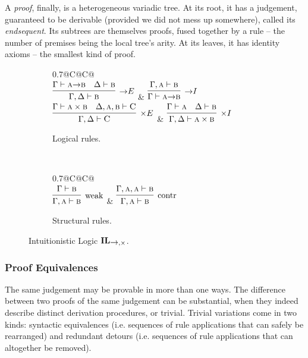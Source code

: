 A \textit{proof}, finally, is a heterogeneous variadic tree.
At its root, it has a judgement, guaranteed to be derivable (provided we did not mess up somewhere), called its \textit{endsequent}.
Its subtrees are themselves proofs, fused together by a rule -- the number of premises being the local tree's arity.
At its leaves, it has identity axioms -- the smallest kind of proof.

\begin{figure}
	\centering
	\begin{subfigure}{1\textwidth}
		\centering
		\begin{tabularx}{0.7\textwidth}{@{}C@{\qquad}C@{}}
		\\[\smallsep]
		$\infer[\ii E]{\Gamma, \Delta \vdash \prop{b}}{\Gamma \vdash \prop{a} \ii \prop{b} & \Delta \vdash \prop{b}}$ 
		& 
		$\infer[\ii I]{\Gamma \vdash \prop{a} \ii \prop{b}}{\Gamma, \prop{a} \vdash \prop{b}}$\\[\smallsep]
		$\infer[\times E]{\Gamma,\Delta \vdash \prop C}{\Gamma \vdash \prop{a} \times \prop{b} & \Delta, \prop{a} , \prop{b} \vdash \prop C}$ 
		&
		$\infer[\times I]{\Gamma, \Delta \vdash \prop{a} \times \prop{b}}{\Gamma \vdash \prop{a} & \Delta \vdash \prop{b}}$
		\end{tabularx}
		\caption{Logical rules.}
		\label{subfigure:intuitionistic_logic_rules:logical}
	\end{subfigure}\\[\midsep]
	\begin{subfigure}{1\textwidth}
		\centering
		\begin{tabularx}{0.7\textwidth}{@{}C@{\qquad}C@{}}
		\\[\smallsep]
		$\infer[\Weakening{}]{\Gamma, \prop{a} \vdash \prop{b}}{\Gamma \vdash \prop{b}} $ 
		&
		$\infer[\Contraction{}]{\Gamma, \prop{a} \vdash \prop{b}}{\Gamma, \prop{a}, \prop{a} \vdash \prop{b}}$
		\end{tabularx}
		\caption{Structural rules.}
		\label{subfigure:intuitionistic_logic_rules:structural}
	\end{subfigure}
	\caption{Intuitionistic Logic $\IL_{\ii,\times}$.}
	\label{figure:intuitioistic_logic_rules}
\end{figure}

\subsubsection{Proof Equivalences}
The same judgement may be provable in more than one ways.
The difference between two proofs of the same judgement can be substantial, when they indeed describe distinct derivation procedures, or trivial.
Trivial variations come in two kinds: syntactic equivalences (i.e. sequences of rule applications that can safely be rearranged) and redundant detours (i.e. sequences of rule applications that can altogether be removed).

